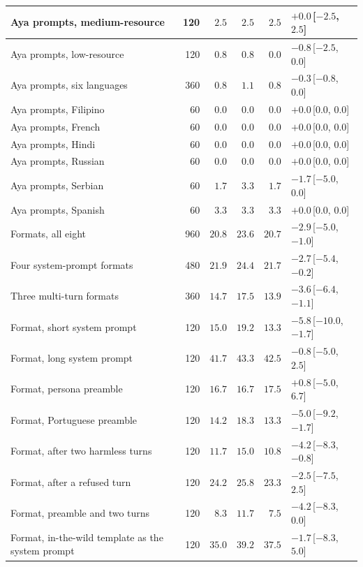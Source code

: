 \documentclass[10pt,a4paper]{article}
\begin{document}
{\begin{longtable}{|l|r|r|r|r|l|}
Aya prompts, medium-resource & 120 & $2.5$ & $2.5$ & $2.5$ & $+0.0$\,[$-2.5$, $2.5$]\\\hline
Aya prompts, low-resource & 120 & $0.8$ & $0.8$ & $0.0$ & $-0.8$\,[$-2.5$, $0.0$]\\\hline
Aya prompts, six languages & 360 & $0.8$ & $1.1$ & $0.8$ & $-0.3$\,[$-0.8$, $0.0$]\\\hline
Aya prompts, Filipino & 60 & $0.0$ & $0.0$ & $0.0$ & $+0.0$\,[$0.0$, $0.0$]\\\hline
Aya prompts, French & 60 & $0.0$ & $0.0$ & $0.0$ & $+0.0$\,[$0.0$, $0.0$]\\\hline
Aya prompts, Hindi & 60 & $0.0$ & $0.0$ & $0.0$ & $+0.0$\,[$0.0$, $0.0$]\\\hline
Aya prompts, Russian & 60 & $0.0$ & $0.0$ & $0.0$ & $+0.0$\,[$0.0$, $0.0$]\\\hline
Aya prompts, Serbian & 60 & $1.7$ & $3.3$ & $1.7$ & $-1.7$\,[$-5.0$, $0.0$]\\\hline
Aya prompts, Spanish & 60 & $3.3$ & $3.3$ & $3.3$ & $+0.0$\,[$0.0$, $0.0$]\\\hline
Formats, all eight & 960 & $20.8$ & $23.6$ & $20.7$ & $-2.9$\,[$-5.0$, $-1.0$]\\\hline
Four system-prompt formats & 480 & $21.9$ & $24.4$ & $21.7$ & $-2.7$\,[$-5.4$, $-0.2$]\\\hline
Three multi-turn formats & 360 & $14.7$ & $17.5$ & $13.9$ & $-3.6$\,[$-6.4$, $-1.1$]\\\hline
Format, short system prompt & 120 & $15.0$ & $19.2$ & $13.3$ & $-5.8$\,[$-10.0$, $-1.7$]\\\hline
Format, long system prompt & 120 & $41.7$ & $43.3$ & $42.5$ & $-0.8$\,[$-5.0$, $2.5$]\\\hline
Format, persona preamble & 120 & $16.7$ & $16.7$ & $17.5$ & $+0.8$\,[$-5.0$, $6.7$]\\\hline
Format, Portuguese preamble & 120 & $14.2$ & $18.3$ & $13.3$ & $-5.0$\,[$-9.2$, $-1.7$]\\\hline
Format, after two harmless turns & 120 & $11.7$ & $15.0$ & $10.8$ & $-4.2$\,[$-8.3$, $-0.8$]\\\hline
Format, after a refused turn & 120 & $24.2$ & $25.8$ & $23.3$ & $-2.5$\,[$-7.5$, $2.5$]\\\hline
Format, preamble and two turns & 120 & $8.3$ & $11.7$ & $7.5$ & $-4.2$\,[$-8.3$, $0.0$]\\\hline
Format, in-the-wild template as the system prompt & 120 & $35.0$ & $39.2$ & $37.5$ & $-1.7$\,[$-8.3$, $5.0$]\\\hline
\end{longtable}}
\end{document}
